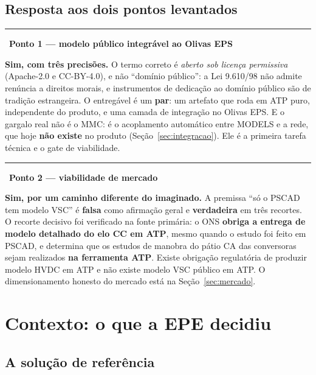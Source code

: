 \documentclass[12pt,a4paper]{article}
\newenvironment{destaque}[1]
  {\par\vspace{6pt}\begin{list}{}{%
     \setlength{\leftmargin}{0.8cm}\setlength{\rightmargin}{0cm}%
     \setlength{\labelwidth}{0pt}\setlength{\labelsep}{0pt}}%
   \item[]\textcolor{acento}{\rule[-1pt]{2pt}{10pt}}\ \textbf{#1}\par\vspace{2pt}\small}
  {\end{list}\vspace{6pt}}
\begin{document}
\subsection{Resposta aos dois pontos levantados}

\begin{destaque}{Ponto 1 --- modelo público integrável ao Olivas EPS}
\textbf{Sim, com três precisões.} O termo correto é \emph{aberto sob licença permissiva}
(Apache-2.0 e CC-BY-4.0), e não \enquote{domínio público}: a Lei 9.610/98 não admite renúncia a
direitos morais, e instrumentos de dedicação ao domínio público são de tradição estrangeira. O
entregável é um \textbf{par}: um artefato que roda em ATP puro, independente do produto, e uma
camada de integração no Olivas EPS. E o gargalo real não é o MMC: é o acoplamento automático entre
MODELS e a rede, que hoje \textbf{não existe} no produto (Seção~\ref{sec:integracao}). Ele é a
primeira tarefa técnica e o gate de viabilidade.
\end{destaque}

\begin{destaque}{Ponto 2 --- viabilidade de mercado}
\textbf{Sim, por um caminho diferente do imaginado.} A premissa \enquote{só o PSCAD tem modelo
VSC} é \textbf{falsa} como afirmação geral e \textbf{verdadeira} em três recortes. O recorte
decisivo foi verificado na fonte primária: o ONS \textbf{obriga a entrega de modelo detalhado do
elo CC em ATP}, mesmo quando o estudo foi feito em PSCAD, e determina que os estudos de manobra do
pátio CA das conversoras sejam realizados \textbf{na ferramenta ATP}. Existe obrigação regulatória
de produzir modelo HVDC em ATP e não existe modelo VSC público em ATP. O dimensionamento honesto do
mercado está na Seção~\ref{sec:mercado}.
\end{destaque}

\section{Contexto: o que a EPE decidiu}

\subsection{A solução de referência}
\end{document}
